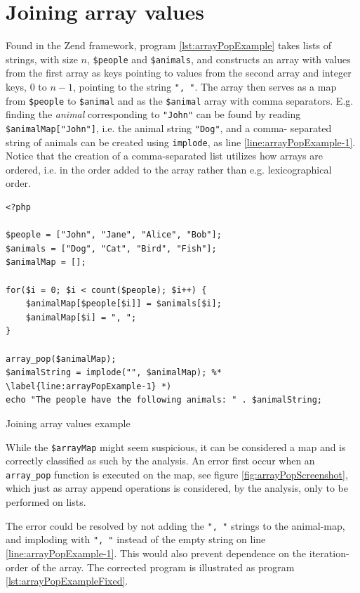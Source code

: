 \newpage
\section{Joining array values}
Found in the Zend framework, program \ref{lst:arrayPopExample} takes lists of strings, with 
size $n$, \texttt{\$people} and \texttt{\$animals}, and constructs an array with values from 
the first array as keys pointing to values from the second array and integer keys, $0$ to 
$n-1$, pointing to the string \texttt{", "}. The array then serves as a map from 
\texttt{\$people} to \texttt{\$animal} and as the \texttt{\$animal} array with comma 
separators. E.g. finding the \textit{animal} corresponding to \texttt{"John"} can be found by 
reading \texttt{\$animalMap["John"]}, i.e. the animal string \texttt{"Dog"}, and a comma-
separated string of animals can be created using \texttt{implode}, as line 
\ref{line:arrayPopExample-1}. Notice that the creation of a comma-separated list utilizes how 
arrays are ordered, i.e. in the order added to the array rather than e.g. lexicographical 
order. 

\begin{program}
\begin{lstlisting}
<?php

$people = ["John", "Jane", "Alice", "Bob"];
$animals = ["Dog", "Cat", "Bird", "Fish"];
$animalMap = [];

for($i = 0; $i < count($people); $i++) {
    $animalMap[$people[$i]] = $animals[$i];
    $animalMap[$i] = ", ";
}

array_pop($animalMap);
$animalString = implode("", $animalMap); %* \label{line:arrayPopExample-1} *)
echo "The people have the following animals: " . $animalString;
\end{lstlisting}
\caption{Joining array values example}
\label{lst:arrayPopExample}
\end{program}


While the \texttt{\$arrayMap} might seem suspicious, it can be considered a map and is 
correctly classified as such by the analysis. An error first occur when an 
\texttt{array\_pop} function is executed on the map, see figure \ref{fig:arrayPopScreenshot}, which just as 
array append operations is considered, by the analysis, only to be performed on lists. 

The error could be resolved by not adding the \texttt{", "} strings to the animal-map, and imploding with \texttt{", "} instead of the empty string on line \ref{line:arrayPopExample-1}. This would also prevent dependence on the iteration-order of the array. The corrected program is illustrated as program \ref{lst:arrayPopExampleFixed}.

